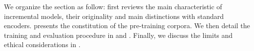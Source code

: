 




We organize the section as follow:  first reviews the main characteristic of incremental models, their originality and main distinctions with standard encoders.  presents the constitution of the pre-training corpora. We then detail the training and evaluation procedure in  and . Finally, we discuss the limits and ethical considerations in .



